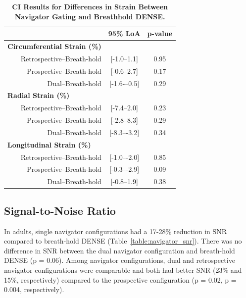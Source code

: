 	\begin{table}
		\centering
		\caption[CI Results for Differences in Strain Between Navigator Gating and Breathhold DENSE]{\textbf{CI Results for Differences in Strain Between Navigator Gating and Breathhold DENSE.}}
		\label{table:nav_CI_strains}
		\begin{tabular}{c c c}
			\toprule
			\multicolumn{1}{c}{}&\multicolumn{1}{c}{\textbf{95\% LoA}} & \multicolumn{1}{c}{\textbf{p-value}}\\ \midrule
			\multicolumn{1}{l}{\textbf{Circumferential Strain (\%)}}   & \multicolumn{2}{c}{}     \\
			\multicolumn{1}{r}{Retrospective--Breath-hold}  & \multicolumn{1}{c}{[-1.0--1.1]}  & \multicolumn{1}{c}{0.95} \\
			\multicolumn{1}{r}{Prospective--Breath-hold}    & \multicolumn{1}{c}{[-0.6--2.7]}  & \multicolumn{1}{c}{0.17} \\
			\multicolumn{1}{r}{Dual--Breath-hold}           & \multicolumn{1}{c}{[-1.6-–0.5]}  & \multicolumn{1}{c}{0.29} \\
			\multicolumn{1}{l}{\textbf{Radial Strain (\%)}}            & \multicolumn{2}{c}{}     \\
			\multicolumn{1}{r}{Retrospective--Breath-hold}  & \multicolumn{1}{c}{[-7.4--2.0]}  & \multicolumn{1}{c}{0.23} \\
			\multicolumn{1}{r}{Prospective--Breath-hold}    & \multicolumn{1}{c}{[-2.8--8.3]}  & \multicolumn{1}{c}{0.29} \\
			\multicolumn{1}{r}{Dual--Breath-hold}           & \multicolumn{1}{c}{[-8.3–-3.2]}  & \multicolumn{1}{c}{0.34} \\
			\multicolumn{1}{l}{\textbf{Longitudinal Strain (\%)}}      & \multicolumn{2}{c}{}     \\
			\multicolumn{1}{r}{Retrospective--Breath-hold}  & \multicolumn{1}{c}{[-1.0–-2.0]}   & \multicolumn{1}{c}{0.85} \\
			\multicolumn{1}{r}{Prospective--Breath-hold}    & \multicolumn{1}{c}{[-0.3–-2.9]}   & \multicolumn{1}{c}{0.09} \\
			\multicolumn{1}{r}{Dual--Breath-hold}           & \multicolumn{1}{c}{[-0.8--1.9]}   & \multicolumn{1}{c}{0.38} \\
			\bottomrule                                 
		\end{tabular}
	\end{table}

\subsection{Signal-to-Noise Ratio}
	In adults, single navigator configurations had a 17-28\% reduction in SNR compared to breath-hold DENSE (Table~\ref{table:navigator_snr}). There was no difference in SNR between the dual navigator configuration and breath-hold DENSE (p = 0.06). Among navigator configurations, dual and retrospective navigator configurations were comparable and both had better SNR (23\% and 15\%, respectively) compared to the prospective configuration (p = 0.02, p = 0.004, respectively).
	
